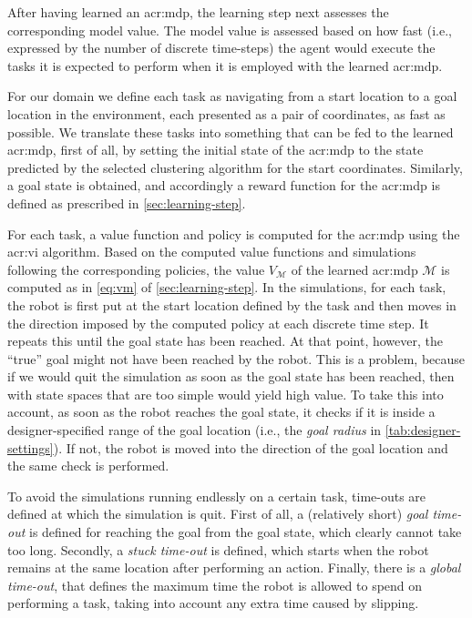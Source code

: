 After having learned an \acrshort{acr:mdp}, the learning step next assesses the corresponding model value.
The model value is assessed based on how fast (i.e., expressed by the number of discrete time-steps) the agent would execute the tasks it is expected to perform when it is employed with the learned \acrshort{acr:mdp}.

For our domain we define each task as navigating from a start location to a goal location in the environment, each presented as a pair of coordinates, as fast as possible.
We translate these tasks into something that can be fed to the learned \acrshort{acr:mdp}, first of all, by setting the initial state of the \acrshort{acr:mdp} to the state predicted by the selected clustering algorithm for the start coordinates.
Similarly, a goal state is obtained, and accordingly a reward function for the \acrshort{acr:mdp} is defined as prescribed in \autoref{sec:learning-step}.

For each task, a value function and policy is computed for the \acrshort{acr:mdp} using the \acrshort{acr:vi} algorithm.
Based on the computed value functions and simulations following the corresponding policies, the value $V_\mathcal{M}$ of the learned \acrshort{acr:mdp} $\mathcal{M}$ is computed as in \autoref{eq:vm} of \autoref{sec:learning-step}.
In the simulations, for each task, the robot is first put at the start location defined by the task and then moves in the direction imposed by the computed policy at each discrete time step.
It repeats this until the goal state has been reached.
At that point, however, the ``true'' goal might not have been reached by the robot.
This is a problem, because if we would quit the simulation as soon as the goal state has been reached, then  with state spaces that are too simple would yield high value.
To take this into account, as soon as the robot reaches the goal state, it checks if it is inside a designer-specified range of the goal location (i.e., the \textit{goal radius} in \autoref{tab:designer-settings}).
If not, the robot is moved into the direction of the goal location and the same check is performed.

To avoid the simulations running endlessly on a certain task, time-outs are defined at which the simulation is quit.
First of all, a (relatively short) \textit{goal time-out} is defined for reaching the goal from the goal state, which clearly cannot take too long.
Secondly, a \textit{stuck time-out} is defined, which starts when the robot remains at the same location after performing an action.
Finally, there is a \textit{global time-out}, that defines the maximum time the robot is allowed to spend on performing a task, taking into account any extra time caused by slipping.

